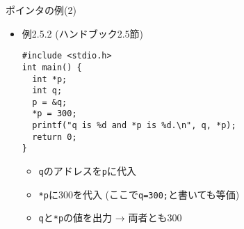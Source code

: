 \begin{frame}[t,fragile]{ポインタの例(2)}
  \begin{itemize}
  \item 例2.5.2 (ハンドブック2.5節)
\begin{lstlisting}
#include <stdio.h>
int main() {
  int *p;
  int q;
  p = &q;
  *p = 300;
  printf("q is %d and *p is %d.\n", q, *p);
  return 0;
}
\end{lstlisting}
\begin{itemize}
\item \verb+q+のアドレスを\verb+p+に代入
\item \verb+*p+に300を代入 (ここで\verb+q=300;+と書いても等価)
\item \verb+q+と\verb+*p+の値を出力 → 両者とも300
\end{itemize}
  \end{itemize}
\end{frame}
